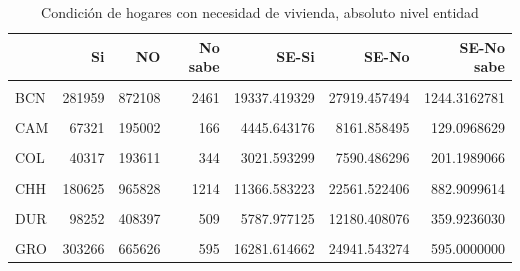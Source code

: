 \documentclass[
]{article}
\begin{document}
\begin{table}[H]

\caption{\label{tab:unnamed-chunk-15}Condición de hogares con necesidad de vivienda, absoluto nivel entidad}
\centering
\begin{tabular}[t]{lrrrrrr}
\toprule
  & Si & NO & No sabe & SE-Si & SE-No & SE-No sabe\\
\midrule
\cellcolor{gray!6}{AGU} & \cellcolor{gray!6}{61505} & \cellcolor{gray!6}{335194} & \cellcolor{gray!6}{1071} & \cellcolor{gray!6}{3974.823389} & \cellcolor{gray!6}{8564.766518} & \cellcolor{gray!6}{475.7383443}\\
BCN & 281959 & 872108 & 2461 & 19337.419329 & 27919.457494 & 1244.3162781\\
\cellcolor{gray!6}{BCS} & \cellcolor{gray!6}{64373} & \cellcolor{gray!6}{182547} & \cellcolor{gray!6}{0} & \cellcolor{gray!6}{5173.874742} & \cellcolor{gray!6}{6449.383018} & \cellcolor{gray!6}{0.0000000}\\
CAM & 67321 & 195002 & 166 & 4445.643176 & 8161.858495 & 129.0968629\\
\cellcolor{gray!6}{COA} & \cellcolor{gray!6}{163939} & \cellcolor{gray!6}{747788} & \cellcolor{gray!6}{1842} & \cellcolor{gray!6}{10105.564449} & \cellcolor{gray!6}{19628.361907} & \cellcolor{gray!6}{933.9657381}\\
\addlinespace
COL & 40317 & 193611 & 344 & 3021.593299 & 7590.486296 & 201.1989066\\
\cellcolor{gray!6}{CHP} & \cellcolor{gray!6}{400920} & \cellcolor{gray!6}{1057487} & \cellcolor{gray!6}{1961} & \cellcolor{gray!6}{24523.240800} & \cellcolor{gray!6}{51431.143341} & \cellcolor{gray!6}{1401.0014276}\\
CHH & 180625 & 965828 & 1214 & 11366.583223 & 22561.522406 & 882.9099614\\
\cellcolor{gray!6}{CMX} & \cellcolor{gray!6}{759121} & \cellcolor{gray!6}{2046170} & \cellcolor{gray!6}{3361} & \cellcolor{gray!6}{39095.924432} & \cellcolor{gray!6}{48555.506365} & \cellcolor{gray!6}{2378.1255223}\\
DUR & 98252 & 408397 & 509 & 5787.977125 & 12180.408076 & 359.9236030\\
\addlinespace
\cellcolor{gray!6}{GUA} & \cellcolor{gray!6}{329132} & \cellcolor{gray!6}{1330149} & \cellcolor{gray!6}{4468} & \cellcolor{gray!6}{18324.931722} & \cellcolor{gray!6}{40831.519700} & \cellcolor{gray!6}{2044.6735681}\\
GRO & 303266 & 665626 & 595 & 16281.614662 & 24941.543274 & 595.0000000\\

\end{tabular}
\end{table}
\end{document}
